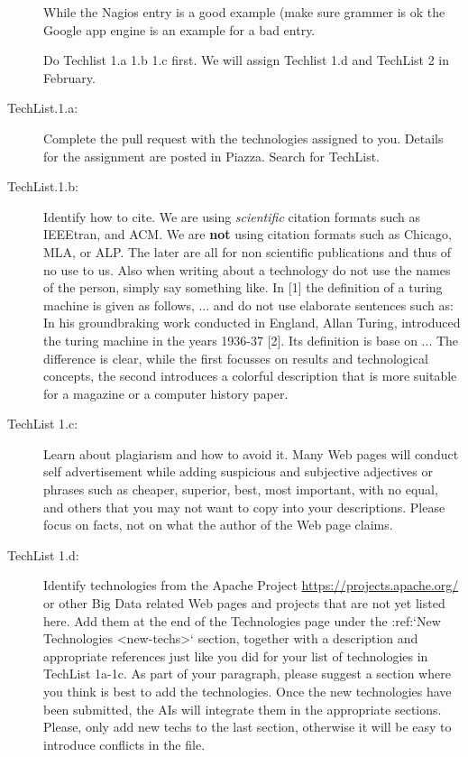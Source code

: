 \begin{description}
  While the Nagios entry is a good example (make sure grammer is ok
  the Google app engine is an example for a bad entry.

  Do Techlist 1.a 1.b 1.c first. We  will assign Techlist 1.d and
  TechList 2 in February.

\item[TechList.1.a:]  Complete the pull request with the technologies assigned to you.
  Details for the assignment are posted in Piazza. Search for TechList.

\item[TechList.1.b:] Identify how to cite. We are using \textit{scientific} citation
  formats such as IEEEtran, and ACM. We are {\bf not} using citation
  formats such as Chicago, MLA, or ALP. The later are all for non
  scientific publications and thus of no use to us. Also when writing
  about a technology do not use the names of the person, simply say
  something like. In [1] the definition of a turing machine is given
  as follows, ...  and do not use elaborate sentences such as: In his
  groundbraking work conducted in England, Allan Turing, introduced
  the turing machine in the years 1936-37 [2]. Its definition is base
  on ... The difference is clear, while the first focusses on results
  and technological concepts, the second introduces a colorful
  description that is more suitable for a magazine or a computer
  history paper.

\item[TechList 1.c:]
  Learn about plagiarism and how to avoid it.
  Many Web pages will conduct self advertisement while adding
  suspicious and subjective adjectives or phrases such as cheaper,
  superior, best, most important, with no equal, and others that you
  may not want to copy into your descriptions. Please focus on facts,
  not on what the author of the Web page claims.

\item[TechList 1.d:]
  Identify technologies from the Apache Project
  \url{https://projects.apache.org/} or other Big Data related Web pages
  and projects that are not yet listed here. Add them at the end of
  the Technologies page under the :ref:`New Technologies <new-techs>`
  section, together with a description and appropriate references just
  like you did for your list of technologies in TechList 1a-1c. As
  part of your paragraph, please suggest a section where you think is
  best to add the technologies. Once the new technologies have been
  submitted, the AIs will integrate them in the appropriate
  sections. Please, only add new techs to the last section, otherwise
  it will be easy to introduce conflicts in the file.


\end{description}
